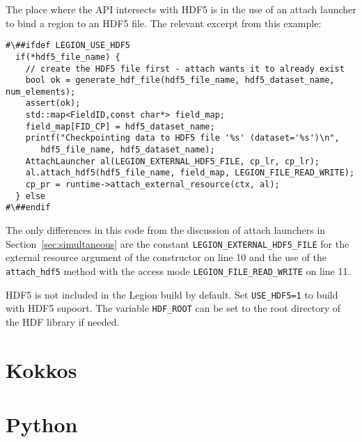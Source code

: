 The place where the API intersects with HDF5 is in the use of an attach launcher to bind a region to an HDF5 file.
The relevant excerpt from this example:
\begin{lstlisting}
#\##ifdef LEGION_USE_HDF5
  if(*hdf5_file_name) {
    // create the HDF5 file first - attach wants it to already exist
    bool ok = generate_hdf_file(hdf5_file_name, hdf5_dataset_name, num_elements);
    assert(ok);
    std::map<FieldID,const char*> field_map;
    field_map[FID_CP] = hdf5_dataset_name;
    printf("Checkpointing data to HDF5 file '%s' (dataset='%s')\n",
	   hdf5_file_name, hdf5_dataset_name);
    AttachLauncher al(LEGION_EXTERNAL_HDF5_FILE, cp_lr, cp_lr);
    al.attach_hdf5(hdf5_file_name, field_map, LEGION_FILE_READ_WRITE);
    cp_pr = runtime->attach_external_resource(ctx, al);
  } else
#\##endif
\end{lstlisting}
The only differences in this code from the discussion of attach
launchers in Section~\ref{sec:simultaneous} are
the constant {\tt LEGION\_EXTERNAL\_HDF5\_FILE} for the external resource argument of the constructor on line 10 and the use of the
{\tt attach\_hdf5} method with the access mode {\tt  LEGION\_FILE\_READ\_WRITE} on line 11.

HDF5 is not included in the Legion build by default.  Set {\tt USE\_HDF5=1} to build with HDF5 supoort.
The variable {\tt HDF\_ROOT} can be set to the root directory of the HDF library if needed.

\section{Kokkos}
\label{sec:kokkos}

\section{Python}
\label{sec:python}
